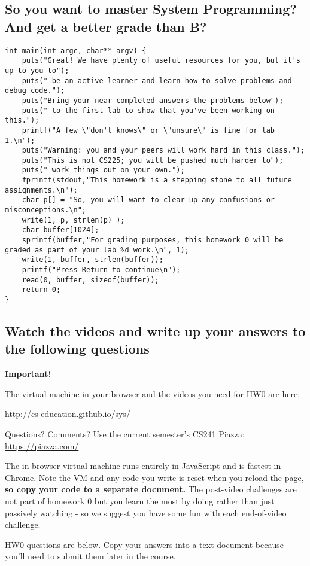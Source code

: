 \subsection{So you want to master System Programming? And get a better grade than B?}

\begin{verbatim}
int main(int argc, char** argv) {
	puts("Great! We have plenty of useful resources for you, but it's up to you to");
	puts(" be an active learner and learn how to solve problems and debug code.");
	puts("Bring your near-completed answers the problems below");
	puts(" to the first lab to show that you've been working on this.");
	printf("A few \"don't knows\" or \"unsure\" is fine for lab 1.\n");
	puts("Warning: you and your peers will work hard in this class.");
	puts("This is not CS225; you will be pushed much harder to");
	puts(" work things out on your own.");
	fprintf(stdout,"This homework is a stepping stone to all future assignments.\n");
	char p[] = "So, you will want to clear up any confusions or misconceptions.\n";
	write(1, p, strlen(p) );
	char buffer[1024];
	sprintf(buffer,"For grading purposes, this homework 0 will be graded as part of your lab %d work.\n", 1);
	write(1, buffer, strlen(buffer));
	printf("Press Return to continue\n");
	read(0, buffer, sizeof(buffer));
	return 0;
}
\end{verbatim}

\subsection{Watch the videos and write up your answers to the following questions}

\textbf{Important!}

The virtual machine-in-your-browser and the videos you need for HW0 are here:

\url{http://cs-education.github.io/sys/}

Questions? Comments? Use the current semester's CS241 Piazza:
\url{https://piazza.com/}

The in-browser virtual machine runs entirely in JavaScript and is fastest in Chrome. Note the VM and any code you write is reset when you reload the page, \textbf{so copy your code to a separate document.} The post-video challenges are not part of homework 0 but you learn the most by doing rather than just passively watching - so we suggest you have some fun with each end-of-video challenge.

HW0 questions are below. Copy your answers into a text document because you'll need to submit them later in the course.

